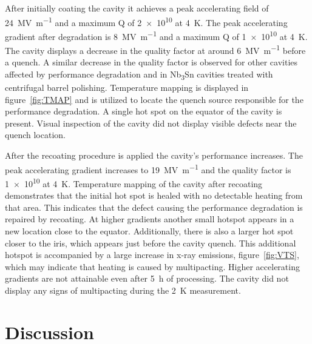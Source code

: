 After initially coating the cavity it achieves a peak accelerating field of \qty{24}{\mega\volt\per\meter} and a maximum Q of \num{2e10} at \qty{4}{\kelvin}. The peak accelerating gradient after degradation is \qty{8}{\mega\volt\per\meter} and a maximum Q of \num{1e10} at \qty{4}{\kelvin}. The cavity displays a decrease in the quality factor at around \qty{6}{\mega\volt\per\meter} before a quench. A similar decrease in the quality factor is observed for other cavities affected by performance degradation\cite{eremeev2023preservation,eremeev:srf2019-mop015} and in Nb\textsubscript{3}Sn cavities treated with centrifugal barrel polishing\cite{viklund2024improving}. Temperature mapping is displayed in figure~\ref{fig:TMAP} and is utilized to locate the quench source responsible for the performance degradation. A single hot spot on the equator of the cavity is present. Visual inspection of the cavity did not display visible defects near the quench location.

After the recoating procedure is applied the cavity's performance increases. The peak accelerating gradient increases to \qty{19}{\mega\volt\per\meter} and the quality factor is \num{1e10} at \qty{4}{\kelvin}. Temperature mapping of the cavity after recoating demonstrates that the initial hot spot is healed with no detectable heating from that area. This indicates that the defect causing the performance degradation is repaired by recoating. At higher gradients another small hotspot appears in a new location close to the equator. Additionally, there is also a larger hot spot closer to the iris, which appears just before the cavity quench. This additional hotspot is accompanied by a large increase in x-ray emissions, figure~\ref{fig:VTS}, which may indicate that heating is caused by multipacting. Higher accelerating gradients are not attainable even after \qty{5}{\hour} of processing. The cavity did not display any signs of multipacting during the \qty{2}{\kelvin} measurement.



\section*{Discussion}
\label{sec:Discussion}

